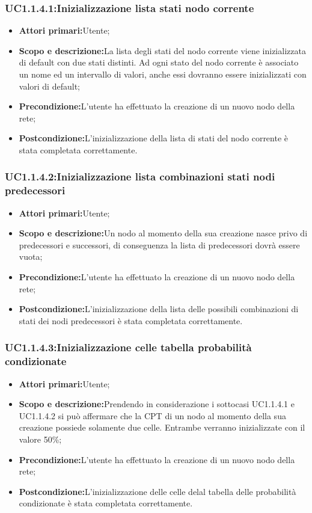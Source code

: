 \subsubsection{UC1.1.4.1:Inizializzazione lista stati nodo corrente}
\begin{itemize}
	\item{\textbf{Attori primari:}Utente;}
	\item{\textbf{Scopo e descrizione:}La lista degli stati del nodo corrente viene inizializzata di default con due stati distinti. Ad ogni stato del nodo corrente è associato un nome ed un intervallo di valori, anche essi dovranno essere inizializzati con valori di default;}
	\item{\textbf{Precondizione:}L'utente ha effettuato la creazione di un nuovo nodo della rete;}
	\item{\textbf{Postcondizione:}L'inizializzazione della lista di stati del nodo corrente è stata completata correttamente.}
\end{itemize}
\subsubsection{UC1.1.4.2:Inizializzazione lista combinazioni stati nodi predecessori}
\begin{itemize}
	\item{\textbf{Attori primari:}Utente;}
	\item{\textbf{Scopo e descrizione:}Un nodo al momento della sua creazione nasce privo di predecessori e successori, di conseguenza la lista di predecessori dovrà essere vuota;}
	\item{\textbf{Precondizione:}L'utente ha effettuato la creazione di un nuovo nodo della rete;}
	\item{\textbf{Postcondizione:}L'inizializzazione della lista delle possibili combinazioni di stati dei nodi predecessori è stata completata correttamente.}
\end{itemize}
\subsubsection{UC1.1.4.3:Inizializzazione celle tabella probabilità condizionate}
\begin{itemize}
	\item{\textbf{Attori primari:}Utente;}
	\item{\textbf{Scopo e descrizione:}Prendendo in considerazione i sottocasi UC1.1.4.1 e UC1.1.4.2 si può affermare che la CPT di un nodo al momento della sua creazione possiede solamente due celle. Entrambe verranno inizializzate con il valore 50\%;}
	\item{\textbf{Precondizione:}L'utente ha effettuato la creazione di un nuovo nodo della rete;}
	\item{\textbf{Postcondizione:}L'inizializzazione delle celle delal tabella delle probabilità condizionate è stata completata correttamente.}
\end{itemize}


